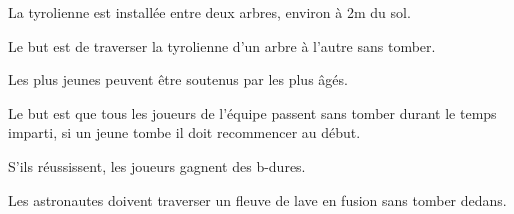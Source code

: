 \documentclass{grand-jeu}
\begin{document}
\begin{liste-materiel}
\end{liste-materiel}

\begin{regles}
La tyrolienne est installée entre deux arbres, environ à 2m du sol. 

Le but est de traverser la tyrolienne d'un arbre à l'autre sans tomber. 

Les plus jeunes peuvent être soutenus par les plus âgés. 

Le but est que tous les joueurs de l'équipe passent sans tomber durant le temps imparti, si un jeune tombe il doit recommencer au début.

S’ils réussissent, les joueurs gagnent des b-dures. 
\end{regles}

\begin{imaginaire}
Les astronautes doivent traverser un fleuve de lave en fusion sans tomber dedans. 
\end{imaginaire}

\begin{moments-stop}
\end{moments-stop}
\end{document}

